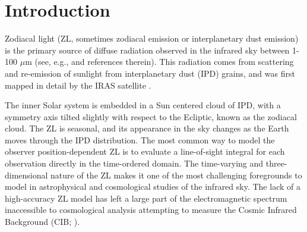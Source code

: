 \documentclass[twocolumn]{aa}
\begin{document}

   \maketitle

\setcounter{tocdepth}{2}
\tableofcontents
   

\section{Introduction}
Zodiacal light (ZL, sometimes zodiacal emission or interplanetary dust
emission) is the primary source of diffuse radiation observed in the
infrared sky between 1-100 $\mu$m (see, e.g., \citealp{Leinert1998}
and references therein). This radiation comes from scattering and
re-emission of sunlight from interplanetary dust (IPD) grains, and was
first mapped in detail by the IRAS satellite
\citep{neugebauer:1984}.

The inner Solar system is embedded in a Sun centered cloud of IPD,
with a symmetry axis tilted slightly with respect to the Ecliptic,
known as the zodiacal cloud. The ZL is seasonal, and its appearance in
the sky changes as the Earth moves through the IPD distribution. The
most common way to model the observer position-dependent ZL is to
evaluate a line-of-sight integral for each observation directly in the
time-ordered domain. The time-varying and three-dimensional nature of
the ZL makes it one of the most challenging foregrounds to model in
astrophysical and cosmological studies of the infrared sky. The lack
of a high-accuracy ZL model has left a large part of the
electromagnetic spectrum inaccessible to cosmological analysis
attempting to measure the Cosmic Infrared Background (CIB;
\citealp{partridge1967,hauser1998,hauser:2001}).
\end{document}
